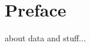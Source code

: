 \documentclass[../main.tex]{subfiles}
\begin{document}


\begin{summaryspacing}
  
\end{summaryspacing}

\begin{summaryspacing}
  
\end{summaryspacing}

\chapter*{Preface}
about data and stuff...
\end{document}
